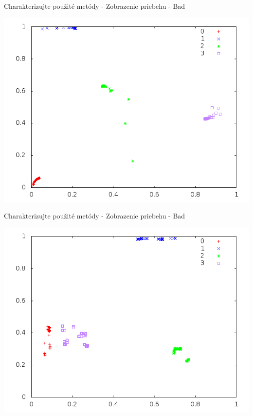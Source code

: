 \documentclass[xcolor=dvipsnames]{beamer}
\begin{document}
    
\begin{frame}{Charakterizujte použité metódy - Zobrazenie priebehu - Bad}
    \begin{center}
      \includegraphics[scale=0.5]{img/tazisko.png}
    \end{center} 
\end{frame}
\begin{frame}{Charakterizujte použité metódy - Zobrazenie priebehu - Bad}
    \begin{center}
      \includegraphics[scale=0.5]{img/non-convergent.png}
    \end{center} 
\end{frame}


\end{document}
